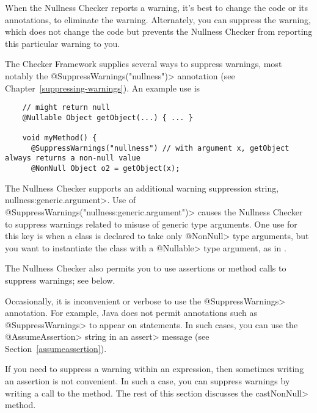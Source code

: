 When the Nullness Checker reports a warning, it's best to change the code
or its annotations, to eliminate the warning.  Alternately, you can
suppress the warning, which does not change the code but prevents the
Nullness Checker from reporting this particular warning to you.

\begin{sloppypar}
The Checker Framework supplies several ways to suppress warnings, most
notably the \<@SuppressWarnings("nullness")> annotation (see
Chapter~\ref{suppressing-warnings}).  An example use is
\end{sloppypar}

\begin{smaller}
\begin{Verbatim}
    // might return null
    @Nullable Object getObject(...) { ... }

    void myMethod() {
      @SuppressWarnings("nullness") // with argument x, getObject always returns a non-null value
      @NonNull Object o2 = getObject(x);
\end{Verbatim}
\end{smaller}


The Nullness Checker supports an additional warning suppression string,
\<nullness:generic.argument>.
Use of \<@SuppressWarnings("nullness:generic.argument")> causes the Nullness
Checker to suppress warnings related to misuse of generic type
arguments.  One use for this key is when a class is declared to take only
\<@NonNull> type arguments, but you want to instantiate the class with a
\<@Nullable> type argument, as in .

The Nullness Checker also permits you to use assertions or method calls to
suppress warnings; see below.




Occasionally, it is inconvenient or
verbose to use the \<@SuppressWarnings> annotation.  For example, Java does
not permit annotations such as \<@SuppressWarnings> to appear on statements.
In such cases, you can use the \<@AssumeAssertion> string in
an \<assert> message (see Section~\ref{assumeassertion}).

If you need to suppress a warning within an expression, then
sometimes writing an assertion is not convenient.  In such a case,
you can suppress warnings by writing a call to the
 method.
The rest of this section discusses the \<castNonNull> method.

